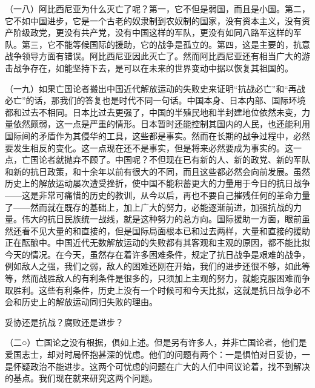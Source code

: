 \documentclass[UTF8, 12pt, a4paper]{ctexrep}
\begin{document}
（一八）阿比西尼亚为什么灭亡了呢？第一，它不但是弱国，而且是小国。第二，它不如中国进步，它是一个古老的奴隶制到农奴制的国家，没有资本主义，没有资产阶级政党，更没有共产党，没有中国这样的军队，更没有如同八路军这样的军队。第三，它不能等候国际的援助，它的战争是孤立的。第四，这是主要的，抗意战争领导方面有错误。阿比西尼亚因此灭亡了。然而阿比西尼亚还有相当广大的游击战争存在，如能坚持下去，是可以在未来的世界变动中据以恢复其祖国的。

（一九）如果亡国论者搬出中国近代解放运动的失败史来证明“抗战必亡”和“再战必亡”的话，那我们的答复也是时代不同一句话。中国本身、日本内部、国际环境都和过去不相同。日本比过去更强了，中国的半殖民地和半封建地位依然未变，力量依然颇弱，这一点是严重的情形。日本暂时还能控制其国内的人民，也还能利用国际间的矛盾作为其侵华的工具，这些都是事实。然而在长期的战争过程中，必然要发生相反的变化。这一点现在还不是事实，但是将来必然要成为事实的。这一点，亡国论者就抛弃不顾了。中国呢？不但现在已有新的人、新的政党、新的军队和新的抗日政策，和十余年以前有很大的不同，而且这些都必然会向前发展。虽然历史上的解放运动屡次遭受挫折，使中国不能积蓄更大的力量用于今日的抗日战争——这是非常可痛惜的历史的教训，从今以后，再也不要自己摧残任何的革命力量了——然而就在既存的基础上，加上广大的努力，必能逐渐前进，加强抗战的力量。伟大的抗日民族统一战线，就是这种努力的总方向。国际援助一方面，眼前虽然还看不见大量的和直接的，但是国际局面根本已和过去两样，大量和直接的援助正在酝酿中。中国近代无数解放运动的失败都有其客观和主观的原因，都不能比拟今天的情况。在今天，虽然存在着许多困难条件，规定了抗日战争是艰难的战争，例如敌人之强，我们之弱，敌人的困难还刚在开始，我们的进步还很不够，如此等等，然而战胜敌人的有利条件是很多的，只须加上主观的努力，就能克服困难而争取胜利。这些有利条件，历史上没有一个时候可和今天比拟，这就是抗日战争必不会和历史上的解放运动同归失败的理由。

妥协还是抗战？腐败还是进步？

（二○）亡国论之没有根据，俱如上述。但是另有许多人，并非亡国论者，他们是爱国志士，却对时局怀抱甚深的忧虑。他们的问题有两个：一是惧怕对日妥协，一是怀疑政治不能进步。这两个可忧虑的问题在广大的人们中间议论着，找不到解决的基点。我们现在就来研究这两个问题。
\end{document}
